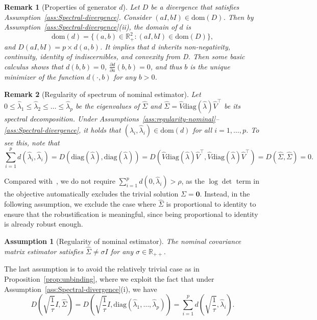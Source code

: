 \documentclass[11pt]{article}
\def\R{\mathbb{R}}
\newtheorem{remark}{Remark}
\newtheorem{assumption}{Assumption}
\def\diag{\mathrm{diag}}
\def\transpose{\top}
\def\R{\mathbb{R}}
\newcommand{\wh}{\widehat}
\begin{document}
\begin{remark}[Properties of generator $d$]\label{remark:minimizer-of-b}
    Let $D$ be a divergence that satisfies Assumption~\ref{ass:Spectral-divergence}. Consider $(aI, bI) \in \mathrm{dom}(D)$. Then by Assumption~\ref{ass:Spectral-divergence}(ii), the domain of $d$ is \[\mathrm{dom}(d) = \{(a,b)\in \R_+^2: (aI, bI)\in \mathrm{dom}(D)\},\] and 
    $D(aI, bI) = p \times d(a,b)$.
    It implies that $d$ inherits non-negativity, continuity, identity of indiscernibles, and convexity from D.
    Then some basic calculus shows that $d(b,b)=0$, $\frac{\partial d}{\partial a}(b,b)=0$, and thus $b$ is the unique minimizer of the function $d(\cdot, b)$ for any $b>0$.
\end{remark}
\begin{remark}[Regularity of spectrum of nominal estimator]
\label{Rem:reg-Spec-esti}
    Let $0\leq \widehat{\lambda}_1\leq \widehat{\lambda}_2\leq  \ldots \leq \widehat{\lambda}_p$ be the eigenvalues of $\widehat{\Sigma}$ and $\widehat{\Sigma}=\widehat{V}\diag({\widehat{\lambda}})\widehat{V}^\transpose$ be its spectral decomposition. Under Assumptions~\ref{ass:regularity-nominal}--
    \ref{ass:Spectral-divergence}, it holds that $(\widehat{\lambda}_i, \widehat{\lambda}_i)\in \mathrm{dom}(d)$ for all $i=1, \ldots ,p$. To see this, note that 
    \[
        \sum_{i=1}^p d(\wh\lambda_i,\wh\lambda_i) = D(\diag(\wh\lambda),\diag(\wh\lambda)) = D(\widehat{V}\diag({\widehat{\lambda}})\widehat{V}^\transpose,\widehat{V}\diag({\widehat{\lambda}})\widehat{V}^\transpose) = D(\wh\Sigma, \wh\Sigma) = 0.
    \]
\end{remark}

Compared with~\citet[Assumption 3]{ref:yue2024geometric}, we do not require $\sum_{i=1}^p d(0, \widehat{\lambda}_i)>  \rho$, as the $\log\det$ term in the objective automatically excludes the trivial solution $\Sigma=\bm 0$. Instead, in the following assumption, we exclude the case where $\wh\Sigma$ is proportional to identity to ensure that the robustification is meaningful, since being proportional to identity is already robust enough.

\begin{assumption}[Regularity of nominal estimator]\label{ass:regularity} 
The nominal covariance matrix estimator satisfies $\wh\Sigma\neq \sigma I$ for any $\sigma\in \R_{++}$.
\end{assumption}


The last assumption is to avoid the relatively trivial case as in Proposition~\ref{prop:unbinding}, where we exploit the fact that under Assumption~\ref{ass:Spectral-divergence}(i), we have
\[
    D\left(\sqrt{\frac{1}{\tau}}I, \wh\Sigma\right) = D\left(\sqrt{\frac{1}{\tau}}I, \diag(\wh\lambda_1,\ldots,\wh\lambda_p)\right) = \sum_{i=1}^pd\left(\sqrt{\frac{1}{\tau}},\widehat{\lambda}_i\right).
\]
\end{document}

